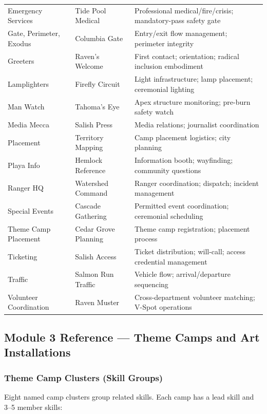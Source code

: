 \documentclass[11pt,letterpaper]{article}
\begin{document}
\begin{center}
\begin{tabularx}{\textwidth}{L{3cm}L{3.5cm}X}
Emergency Services & Tide Pool Medical & Professional medical/fire/crisis; mandatory-pass safety gate \\
Gate, Perimeter, Exodus & Columbia Gate & Entry/exit flow management; perimeter integrity \\
Greeters & Raven's Welcome & First contact; orientation; radical inclusion embodiment \\
Lamplighters & Firefly Circuit & Light infrastructure; lamp placement; ceremonial lighting \\
Man Watch & Tahoma's Eye & Apex structure monitoring; pre-burn safety watch \\
Media Mecca & Salish Press & Media relations; journalist coordination \\
Placement & Territory Mapping & Camp placement logistics; city planning \\
Playa Info & Hemlock Reference & Information booth; wayfinding; community questions \\
Ranger HQ & Watershed Command & Ranger coordination; dispatch; incident management \\
Special Events & Cascade Gathering & Permitted event coordination; ceremonial scheduling \\
Theme Camp Placement & Cedar Grove Planning & Theme camp registration; placement process \\
Ticketing & Salish Access & Ticket distribution; will-call; access credential management \\
Traffic & Salmon Run Traffic & Vehicle flow; arrival/departure sequencing \\
Volunteer Coordination & Raven Muster & Cross-department volunteer matching; V-Spot operations \\
\bottomrule
\end{tabularx}
\end{center}

\subsection{Module 3 Reference --- Theme Camps and Art Installations}

\subsubsection{Theme Camp Clusters (Skill Groups)}

Eight named camp clusters group related skills. Each camp has a lead skill and 3--5 member skills:
\end{document}
